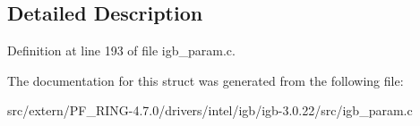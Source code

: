 \subsection{Detailed Description}


Definition at line 193 of file igb\_\-param.c.



The documentation for this struct was generated from the following file:\begin{DoxyCompactItemize}
\item 
src/extern/PF\_\-RING-\/4.7.0/drivers/intel/igb/igb-\/3.0.22/src/igb\_\-param.c\end{DoxyCompactItemize}
